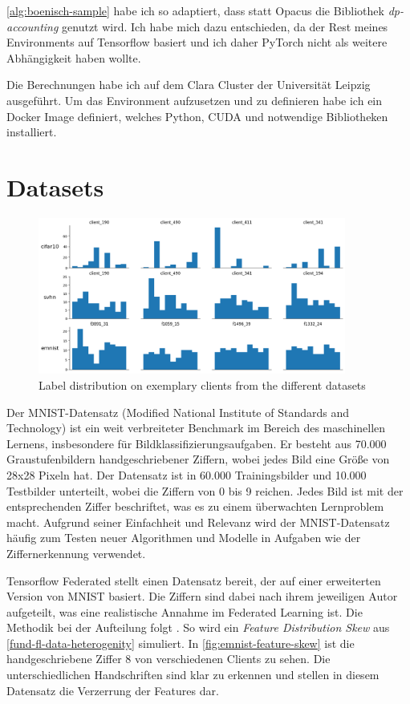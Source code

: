 \autoref{alg:boenisch-sample} habe ich so adaptiert, dass statt Opacus die Bibliothek \textit{dp-accounting} genutzt wird. Ich habe mich dazu entschieden, da der Rest meines Environments auf Tensorflow basiert und ich daher PyTorch nicht als weitere Abhängigkeit haben wollte.

Die Berechnungen habe ich auf dem Clara Cluster der Universität Leipzig ausgeführt. Um das Environment aufzusetzen und zu definieren habe ich ein Docker Image definiert, welches Python, CUDA und notwendige Bibliotheken installiert.

\section{Datasets}

\begin{figure}[tb]
	\centering
	\includegraphics[width=0.9\textwidth]{Bilder/label_distribution.png}
	\caption{Label distribution on exemplary clients from the different datasets}
	\label{fig:label-distribution}
\end{figure}

Der MNIST-Datensatz (Modified National Institute of Standards and Technology) ist ein weit verbreiteter Benchmark im Bereich des maschinellen Lernens, insbesondere für Bildklassifizierungsaufgaben. Er besteht aus 70.000 Graustufenbildern handgeschriebener Ziffern, wobei jedes Bild eine Größe von 28x28 Pixeln hat. Der Datensatz ist in 60.000 Trainingsbilder und 10.000 Testbilder unterteilt, wobei die Ziffern von 0 bis 9 reichen. Jedes Bild ist mit der entsprechenden Ziffer beschriftet, was es zu einem überwachten Lernproblem macht. Aufgrund seiner Einfachheit und Relevanz wird der MNIST-Datensatz häufig zum Testen neuer Algorithmen und Modelle in Aufgaben wie der Ziffernerkennung verwendet.

Tensorflow Federated stellt einen Datensatz bereit, der auf einer erweiterten Version von MNIST basiert. Die Ziffern sind dabei nach ihrem jeweiligen Autor aufgeteilt, was eine realistische Annahme im Federated Learning ist. Die Methodik bei der Aufteilung folgt \textcite{caldas:2018}. So wird ein \textit{Feature Distribution Skew} aus \autoref{fund-fl-data-heterogenity} simuliert. In \autoref{fig:emnist-feature-skew} ist die handgeschriebene Ziffer 8 von verschiedenen Clients zu sehen. Die unterschiedlichen Handschriften sind klar zu erkennen und stellen in diesem Datensatz die Verzerrung der Features dar.

